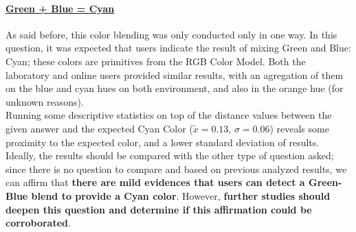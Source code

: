 \paragraph{\ul{Green + Blue = Cyan}}
%
As said before, this color blending was only conducted only in one way. In this question, it was expected that users indicate the result of mixing Green and Blue: Cyan; these colors are primitives from the RGB Color Model. Both the laboratory
and online users provided similar results, with an agregation of them on the blue and cyan hues on both environment, and also in the orange hue (for unknown reasons).  \\
%
Running some descriptive statistics on top of the distance values between the given answer and the expected Cyan Color ($\tilde{x} = 0.13$, $\sigma = 0.06$) reveals some proximity to the expected color, and a lower standard deviation of results.
Ideally, the results should be compared with the other type of question asked; since there is no question to compare and based on previous analyzed results, we can affirm that \textbf{there are mild evidences that users can detect a Green-Blue blend
to provide a Cyan color}. However, \textbf{further studies should deepen this question and determine if this affirmation could be corroborated}.
%
